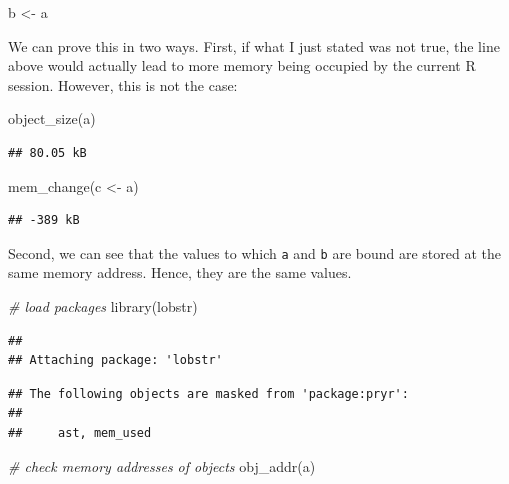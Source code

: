 \documentclass[
  12pt,
]{style/krantz}
\newenvironment{Shaded}{\begin{snugshade}}{\end{snugshade}}
\newcommand{\CommentTok}[1]{\textcolor[rgb]{0.56,0.35,0.01}{\textit{#1}}}
\newcommand{\FunctionTok}[1]{\textcolor[rgb]{0.00,0.00,0.00}{#1}}
\newcommand{\NormalTok}[1]{#1}
\newcommand{\OtherTok}[1]{\textcolor[rgb]{0.56,0.35,0.01}{#1}}
\begin{document}
\begin{Shaded}
\begin{Highlighting}[]
\NormalTok{b }\OtherTok{\textless{}{-}}\NormalTok{ a}
\end{Highlighting}
\end{Shaded}

We can prove this in two ways. First, if what I just stated was not true, the line above would actually lead to more memory being occupied by the current R session. However, this is not the case:

\begin{Shaded}
\begin{Highlighting}[]
\FunctionTok{object\_size}\NormalTok{(a)}
\end{Highlighting}
\end{Shaded}

\begin{verbatim}
## 80.05 kB
\end{verbatim}

\begin{Shaded}
\begin{Highlighting}[]
\FunctionTok{mem\_change}\NormalTok{(c }\OtherTok{\textless{}{-}}\NormalTok{ a)}
\end{Highlighting}
\end{Shaded}

\begin{verbatim}
## -389 kB
\end{verbatim}

Second, we can see that the values to which \texttt{a} and \texttt{b} are bound are stored at the same memory address. Hence, they are the same values.

\begin{Shaded}
\begin{Highlighting}[]
\CommentTok{\# load packages}
\FunctionTok{library}\NormalTok{(lobstr)}
\end{Highlighting}
\end{Shaded}

\begin{verbatim}
## 
## Attaching package: 'lobstr'
\end{verbatim}

\begin{verbatim}
## The following objects are masked from 'package:pryr':
## 
##     ast, mem_used
\end{verbatim}

\begin{Shaded}
\begin{Highlighting}[]
\CommentTok{\# check memory addresses of objects}
\FunctionTok{obj\_addr}\NormalTok{(a)}
\end{Highlighting}
\end{Shaded}
\end{document}
